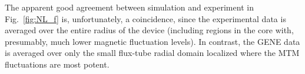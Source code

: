 \documentclass[
 aip,
 amsmath,amssymb,
 reprint
]{revtex4-1}
\begin{document}


The apparent good agreement between simulation and experiment in Fig.~\ref{fig:NL_f} is, unfortunately, a coincidence, since the experimental data is averaged over the entire radius of the device (including regions in the core with, presumably, much lower magnetic fluctuation levels).  In contrast, the GENE data is averaged over only the small flux-tube radial domain localized where the MTM fluctuations are most potent.  
\end{document}

